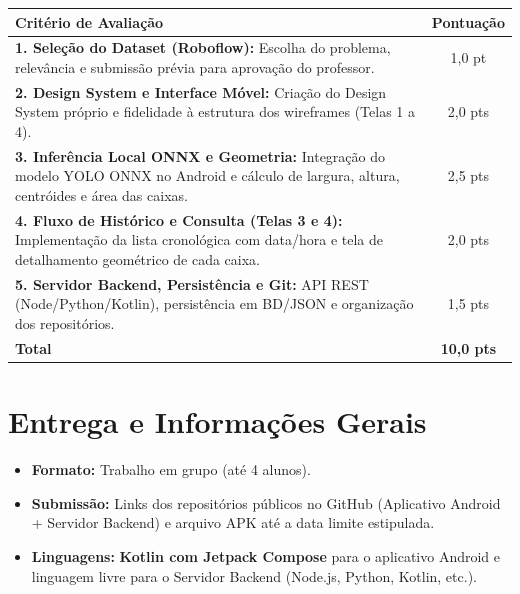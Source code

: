 \documentclass[12pt]{article}
\begin{document}
\begin{table}[h!]
\centering
\begin{tabular}{p{11.5cm}c}
\toprule
\textbf{Critério de Avaliação} & \textbf{Pontuação} \\
\midrule
\textbf{1. Seleção do Dataset (Roboflow):} Escolha do problema, relevância e submissão prévia para aprovação do professor. & 1,0 pt \\
\midrule
\textbf{2. Design System e Interface Móvel:} Criação do Design System próprio e fidelidade à estrutura dos wireframes (Telas 1 a 4). & 2,0 pts \\
\midrule
\textbf{3. Inferência Local ONNX e Geometria:} Integração do modelo YOLO ONNX no Android e cálculo de largura, altura, centróides e área das caixas. & 2,5 pts \\
\midrule
\textbf{4. Fluxo de Histórico e Consulta (Telas 3 e 4):} Implementação da lista cronológica com data/hora e tela de detalhamento geométrico de cada caixa. & 2,0 pts \\
\midrule
\textbf{5. Servidor Backend, Persistência e Git:} API REST (Node/Python/Kotlin), persistência em BD/JSON e organização dos repositórios. & 1,5 pts \\
\bottomrule
\textbf{Total} & \textbf{10,0 pts} \\
\bottomrule
\end{tabular}
\end{table}

\vspace{0.3cm}

\section{Entrega e Informações Gerais}
\begin{itemize}
    \item \textbf{Formato:} Trabalho em grupo (até 4 alunos).
    \item \textbf{Submissão:} Links dos repositórios públicos no GitHub (Aplicativo Android + Servidor Backend) e arquivo APK até a data limite estipulada.
    \item \textbf{Linguagens:} \textbf{Kotlin com Jetpack Compose} para o aplicativo Android e linguagem livre para o Servidor Backend (Node.js, Python, Kotlin, etc.).
\end{itemize}
\end{document}
